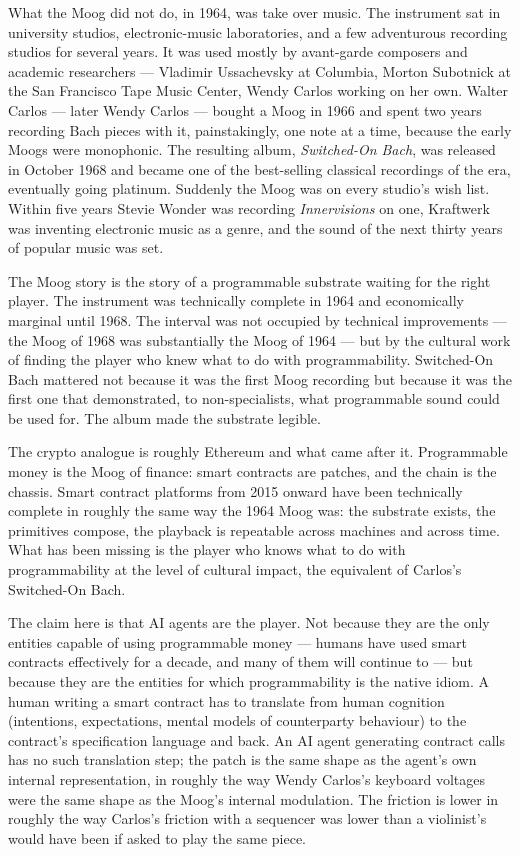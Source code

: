 \documentclass[11pt,a4paper]{article}
\begin{document}
What the Moog did not do, in 1964, was take over music. The instrument
sat in university studios, electronic-music laboratories, and a few
adventurous recording studios for several years. It was used mostly by
avant-garde composers and academic researchers --- Vladimir Ussachevsky
at Columbia, Morton Subotnick at the San Francisco Tape Music Center,
Wendy Carlos working on her own. Walter Carlos --- later Wendy Carlos
--- bought a Moog in 1966 and spent two years recording Bach pieces with
it, painstakingly, one note at a time, because the early Moogs were
monophonic. The resulting album, \emph{Switched-On Bach}, was released
in October 1968 and became one of the best-selling classical recordings
of the era, eventually going platinum. Suddenly the Moog was on every
studio's wish list. Within five years Stevie Wonder was recording
\emph{Innervisions} on one, Kraftwerk was inventing electronic music as
a genre, and the sound of the next thirty years of popular music was
set.

The Moog story is the story of a programmable substrate waiting for the
right player. The instrument was technically complete in 1964 and
economically marginal until 1968. The interval was not occupied by
technical improvements --- the Moog of 1968 was substantially the Moog
of 1964 --- but by the cultural work of finding the player who knew what
to do with programmability. Switched-On Bach mattered not because it was
the first Moog recording but because it was the first one that
demonstrated, to non-specialists, what programmable sound could be used
for. The album made the substrate legible.

The crypto analogue is roughly Ethereum and what came after it.
Programmable money is the Moog of finance: smart contracts are patches,
and the chain is the chassis. Smart contract platforms from 2015 onward
have been technically complete in roughly the same way the 1964 Moog
was: the substrate exists, the primitives compose, the playback is
repeatable across machines and across time. What has been missing is the
player who knows what to do with programmability at the level of
cultural impact, the equivalent of Carlos's Switched-On Bach.

The claim here is that AI agents are the player. Not because they are
the only entities capable of using programmable money --- humans have
used smart contracts effectively for a decade, and many of them will
continue to --- but because they are the entities for which
programmability is the native idiom. A human writing a smart contract
has to translate from human cognition (intentions, expectations, mental
models of counterparty behaviour) to the contract's specification
language and back. An AI agent generating contract calls has no such
translation step; the patch is the same shape as the agent's own
internal representation, in roughly the way Wendy Carlos's keyboard
voltages were the same shape as the Moog's internal modulation. The
friction is lower in roughly the way Carlos's friction with a sequencer
was lower than a violinist's would have been if asked to play the same
piece.
\end{document}
